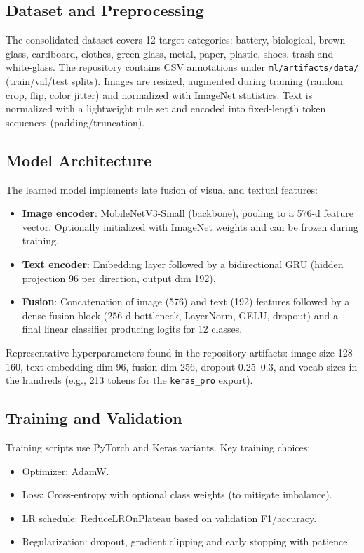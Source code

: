 \documentclass[conference]{IEEEtran}
\begin{document}
\subsection{Dataset and Preprocessing}
The consolidated dataset covers 12 target categories: battery, biological, brown-glass, cardboard, clothes, green-glass, metal, paper, plastic, shoes, trash and white-glass. The repository contains CSV annotations under \texttt{ml/artifacts/data/} (train/val/test splits). Images are resized, augmented during training (random crop, flip, color jitter) and normalized with ImageNet statistics. Text is normalized with a lightweight rule set and encoded into fixed-length token sequences (padding/truncation).

\subsection{Model Architecture}
The learned model implements late fusion of visual and textual features:
\begin{itemize}
	\item \textbf{Image encoder}: MobileNetV3-Small (backbone), pooling to a 576-d feature vector. Optionally initialized with ImageNet weights and can be frozen during training.
	\item \textbf{Text encoder}: Embedding layer followed by a bidirectional GRU (hidden projection 96 per direction, output dim 192).
	\item \textbf{Fusion}: Concatenation of image (576) and text (192) features followed by a dense fusion block (256-d bottleneck, LayerNorm, GELU, dropout) and a final linear classifier producing logits for 12 classes.
\end{itemize}

Representative hyperparameters found in the repository artifacts: image size 128--160, text embedding dim 96, fusion dim 256, dropout 0.25--0.3, and vocab sizes in the hundreds (e.g., 213 tokens for the \texttt{keras\_pro} export).

\subsection{Training and Validation}
Training scripts use PyTorch and Keras variants. Key training choices:
\begin{itemize}
	\item Optimizer: AdamW.
	\item Loss: Cross-entropy with optional class weights (to mitigate imbalance).
	\item LR schedule: ReduceLROnPlateau based on validation F1/accuracy.
	\item Regularization: dropout, gradient clipping and early stopping with patience.
\end{itemize}
\end{document}
